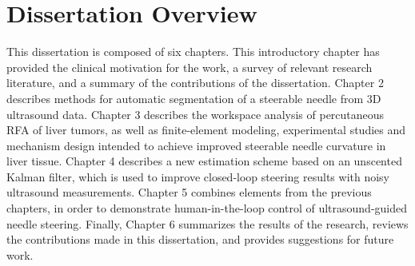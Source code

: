 \section{Dissertation Overview}
This dissertation is composed of six chapters. This introductory chapter has provided the clinical motivation for the work, a survey of relevant research literature, and a summary of the contributions of the dissertation. Chapter 2 describes methods for automatic segmentation of a steerable needle from 3D ultrasound data. Chapter 3 describes the workspace analysis of percutaneous RFA of liver tumors, as well as finite-element modeling, experimental studies and mechanism design intended to achieve improved steerable needle curvature in liver tissue. Chapter 4 describes a new estimation scheme based on an unscented Kalman filter, which is used to improve closed-loop steering results with noisy ultrasound measurements.
Chapter 5 combines elements from the previous chapters, in order to demonstrate human-in-the-loop control of ultrasound-guided needle steering. Finally, Chapter 6 summarizes the results of the research, reviews the contributions made in this dissertation, and provides suggestions for future work.